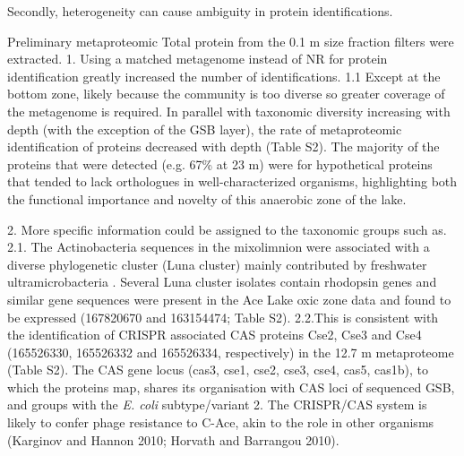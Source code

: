 Secondly, heterogeneity can cause ambiguity in protein identifications.


Preliminary metaproteomic Total protein from the 0.1 \textmu{}m size fraction filters were extracted.
1. Using a matched metagenome instead of \ac{NR} for protein identification greatly increased the number of identifications.
1.1 Except at the bottom zone, likely because the community is too diverse so greater coverage of the metagenome is required. %
In parallel with taxonomic diversity increasing with depth (with the exception of the GSB layer), the rate of metaproteomic identification of proteins decreased with depth (Table S2). 
The majority of the proteins that were detected (e.g. 67\% at 23 m) were for hypothetical proteins that tended to lack orthologues in well-characterized organisms, highlighting both the functional importance and novelty of this anaerobic zone of the lake.


2. More specific information could be assigned to the taxonomic groups such as.
2.1. The Actinobacteria sequences in the mixolimnion were associated with a diverse phylogenetic cluster (Luna cluster) mainly contributed by freshwater ultramicrobacteria \cite{Hahn2003}. 
Several Luna cluster isolates contain rhodopsin genes \cite{Sharma2009} and similar gene sequences were present in the Ace Lake oxic zone data and found to be expressed (167820670 and 163154474; Table S2).
2.2.This is consistent with the identification of \ac{CRISPR} associated \ac{CAS} proteins Cse2, Cse3 and Cse4 (165526330, 165526332 and 165526334, respectively) in the 12.7 m metaproteome (Table S2). 
The \ac{CAS} gene locus (cas3, cse1, cse2, cse3, cse4, cas5, cas1b), to which the proteins map, shares its organisation with \ac{CAS} loci of sequenced \ac{GSB}, and groups with the \emph{E. coli} subtype/variant 2. The \ac{CRISPR}/\ac{CAS} system is likely to confer phage resistance to C-Ace, akin to the role in other organisms (Karginov and Hannon 2010; Horvath and Barrangou 2010).

